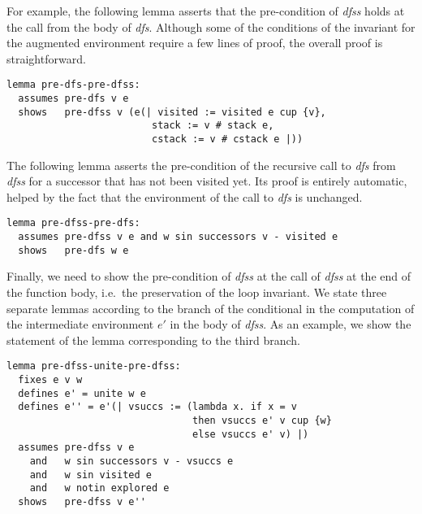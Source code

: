 \documentclass[sigplan,10pt,anonymous,review]{acmart}
\newcommand{\prog}[1]{\textit{#1}}
\begin{document}
For example, the following lemma asserts that the pre-condition of \prog{dfss} holds at the call from the body of \prog{dfs}. Although some of the conditions of the invariant for the augmented environment require a few lines of proof, the overall proof is straightforward.

\begin{small}
\begin{lstlisting}[language=isabelle]
lemma pre-dfs-pre-dfss:
  assumes pre-dfs v e
  shows   pre-dfss v (e(| visited := visited e cup {v},
                         stack := v # stack e,
                         cstack := v # cstack e |))
\end{lstlisting}
\end{small}

The following lemma asserts the pre-condition of the recursive call to \prog{dfs} from \prog{dfss} for a successor that has not been visited yet. Its proof is entirely automatic, helped by the fact that the environment of the call to \prog{dfs} is unchanged.

\begin{small}
\begin{lstlisting}[language=isabelle]
lemma pre-dfss-pre-dfs:
  assumes pre-dfss v e and w sin successors v - visited e
  shows   pre-dfs w e
\end{lstlisting}
\end{small}

Finally, we need to show the pre-condition of \prog{dfss} at the call of \prog{dfss} at the end of the function body, i.e.\ the preservation of the loop invariant. We state three separate lemmas according to the branch of the conditional in the computation of the intermediate environment $e'$ in the body of \prog{dfss}. As an example, we show the statement of the lemma corresponding to the third branch.

\begin{small}
\begin{lstlisting}[language=isabelle]
lemma pre-dfss-unite-pre-dfss:
  fixes e v w
  defines e' = unite w e
  defines e'' = e'(| vsuccs := (lambda x. if x = v 
                                then vsuccs e' v cup {w}
                                else vsuccs e' v) |)
  assumes pre-dfss v e
    and   w sin successors v - vsuccs e
    and   w sin visited e
    and   w notin explored e
  shows   pre-dfss v e''
\end{lstlisting}
\end{small}
\end{document}
